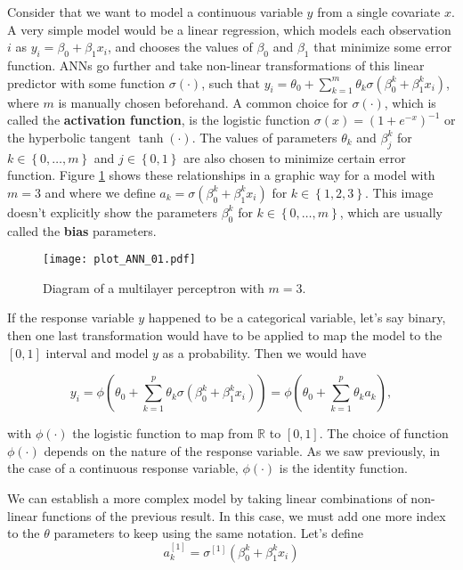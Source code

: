 Consider that we want to model a continuous variable $y$ from a single covariate $x$. A very simple model would be a linear regression, which models each observation $i$ as $y_i = \beta_0 + \beta_1 x_i$, and chooses the values of $\beta_0$ and $\beta_1$ that minimize some error function. ANNs go further and take non-linear transformations of this linear predictor with some function $\sigma(\cdot)$, such that $y_i = \theta_0 +  \sum_{k = 1}^m \theta_k \sigma \left( \beta_0^{k} + \beta_1^{k} x_i \right)$, where $m$ is manually chosen beforehand. A common choice for $\sigma(\cdot)$, which is called the \textbf{activation function}, is the logistic function $\sigma(x) = (1 + e^{-x})^{-1}$
or the hyperbolic tangent $\tanh(\cdot)$. The values of parameters $\theta_k$ and $\beta_j^{k}$ for $k \in \left\{ 0, \ldots, m \right\}$ and $j \in \left\{ 0, 1 \right\}$ are also chosen to minimize certain error function. Figure \ref{fig:theory_ANN_diagram_01} shows these relationships in a graphic way for a model with $m = 3$ and where we define $a_{k} = \sigma \left( \beta_0^{k} + \beta_1^{k} x_i \right)$ for $k \in \left\{ 1, 2, 3 \right\}$.
This image doesn't explicitly show the parameters $\beta_0^{k}$ for $k \in \left\{ 0, \ldots, m \right\}$, which are usually called the \textbf{bias} parameters.

\begin{figure}[H]
    \centering
    \texttt{[image: plot\_ANN\_01.pdf]}
    \caption{Diagram of a multilayer perceptron with $m = 3$.}
    \label{fig:theory_ANN_diagram_01}
\end{figure}

If the response variable $y$ happened to be a categorical variable, let's say binary, then one last transformation would have to be applied to map the model to the $\left[0, 1\right]$ interval and model $y$ as a probability. Then we would have

$$
y_i =
\phi \left( \theta_0 +  \sum_{k = 1}^p \theta_k \sigma \left( \beta_0^{k} + \beta_1^{k} x_i \right) \right) =
\phi \left( \theta_0 +  \sum_{k = 1}^p \theta_k a_{k} \right),
$$

with $\phi(\cdot)$ the logistic function to map from $\mathbb{R}$ to $\left[ 0, 1 \right]$. The choice of function $\phi(\cdot)$ depends on the nature of the response variable. As we saw previously, in the case of a continuous response variable, $\phi(\cdot)$ is the identity function.

We can establish a more complex model by taking linear combinations of non-linear functions of the previous result. In this case, we must add one more index to the $\theta$ parameters to keep using the same notation. Let's define
$$
a_k^{[1]} = \sigma^{[1]} \left( \beta_0^{k} + \beta_1^{k} x_i \right)
$$

